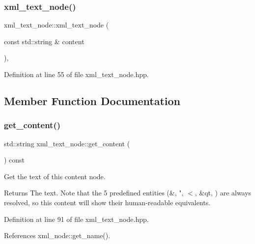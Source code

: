 \subsubsection{\texorpdfstring{xml\+\_\+text\+\_\+node()}{xml\_text\_node()}}
{\footnotesize\ttfamily xml\+\_\+text\+\_\+node\+::xml\+\_\+text\+\_\+node (\begin{DoxyParamCaption}\item[{const std\+::string \&}]{content }\end{DoxyParamCaption})\hspace{0.3cm}{\ttfamily [inline]}, {\ttfamily [explicit]}}



Definition at line 55 of file xml\+\_\+text\+\_\+node.\+hpp.



\subsection{Member Function Documentation}
\mbox{\label{classxml__text__node_afe0c3ab92ada3c4d6326c3150aefaf92}} 
\subsubsection{\texorpdfstring{get\+\_\+content()}{get\_content()}}
{\footnotesize\ttfamily std\+::string xml\+\_\+text\+\_\+node\+::get\+\_\+content (\begin{DoxyParamCaption}{ }\end{DoxyParamCaption}) const\hspace{0.3cm}{\ttfamily [inline]}}



Get the text of this content node. 

\begin{DoxyReturn}{Returns}
The text. Note that the 5 predefined entities (\&, ", $<$, \&qt, \textquotesingle{}) are always resolved, so this content will show their human-\/readable equivalents. 
\end{DoxyReturn}


Definition at line 91 of file xml\+\_\+text\+\_\+node.\+hpp.



References xml\+\_\+node\+::get\+\_\+name().



